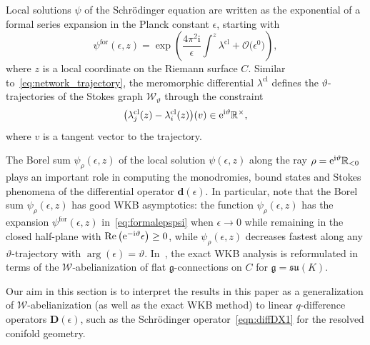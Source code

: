 \documentclass[pdftex]{sigma}
\numberwithin{equation}{section}
\begin{document}
Local solutions $\psi$ of the Schr\"odinger equation are written as the exponential of a formal series expansion in the Planck constant $\epsilon$, starting with
\begin{equation}\label{eq:formalepspsi}
 \psi^\mathrm{for} (\epsilon, z)= \exp \left( \frac{4 \pi^2 \mathrm{i}}{\epsilon} \int^z \lambda^\mathrm{cl} + \mathcal{O}\big(\epsilon^0\big) \right),
\end{equation}
where $z$ is a local coordinate on the Riemann surface $C$. Similar to~\eqref{eq:network_trajectory}, the meromorphic differential $\lambda^\mathrm{cl}$ defines the $\vartheta$-trajectories of the Stokes graph $\mathcal{W}_\vartheta$ through the constraint
\begin{equation*}
 \big(\lambda^\mathrm{cl}_j(z) - \lambda^\mathrm{cl}_i(z)\big) (v) \in {\rm e}^{\mathrm{i} \vartheta} \mathbb{R}^\times,
\end{equation*}
where $v$ is a tangent vector to the trajectory.

The Borel sum $\psi_\rho(\epsilon,z)$ of the local solution $\psi(\epsilon,z)$ along the ray $\rho = {\rm e}^{\mathrm{i} \vartheta} \mathbb{R}_{< 0}$ plays an important role in computing the monodromies, bound states and Stokes phenomena of the differential operator $\mathbf{d}(\epsilon)$. In particular, note that the Borel sum $\psi_\rho(\epsilon,z)$ has good WKB asymptotics: the function $\psi_\rho(\epsilon,z)$ has the expansion $\psi^\mathrm{for} (\epsilon, z)$ in~\eqref{eq:formalepspsi} when $\epsilon \to 0$ while remaining in the closed half-plane with $\operatorname{Re}\big({\rm e}^{- \mathrm{i} \vartheta} \epsilon\big) \ge 0$, while $\psi_\rho(\epsilon,z)$ decreases fastest along any $\vartheta$-trajectory with $\arg(\epsilon) = \vartheta$. In~\cite{Hollands:t3abel}, the exact WKB analysis is reformulated in terms of the $\mathcal{W}$-abelianization of flat $\mathfrak{g}$-connections on $C$ for $\mathfrak{g}= \mathfrak{su}(K)$.

Our aim in this section is to interpret the results in this paper as a generalization of $\mathcal{W}$-abelianization (as well as the exact WKB method) to linear $q$-difference operators $\mathbf{D}(\epsilon)$, such as the Schr\"odinger operator~\eqref{eqn:diffDX1} for the resolved conifold geometry.
\end{document}
